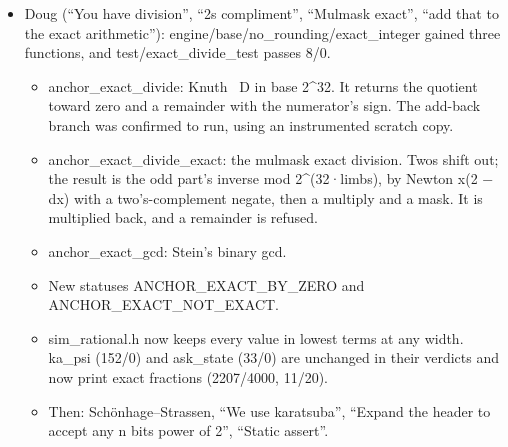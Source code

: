 \begin{enumerate}
\begin{itemize}
\begin{itemize}
\item LEMMA 3.4 IS FALSE AT k = 1. ξ(0.1, 0) − ξ(0, 0.9) = 1/10 − (9/10)α₂ = 0.0090999… < γ\textasciicircum{}−2, and the n = 3 analogue gives 9.0998 units. Lemma 3.8's supports (ramp γ\textasciicircum{}−β(k+1)) overlap at k = 1.
\item The proof's break: (3.11), the α cut at r ≤ k, does hold. It measures exactly 10, 50 and 500050 units for n = 2 at k = 1, 2, 3, and 10 and 5000 units for n = 3 at k = 1, 2. But “the tails cannot annihilate it” does not mean “the tails keep it at or above the bound”.
\item Correct: |µ\_\allowbreak{}k| ≥ γ\textasciicircum{}−nβ(k) − Σ\_\allowbreak{}\{p≥2\}ε\_\allowbreak{}\{k,p\}, about (γ−1)u' with u' = γ\textasciicircum{}−β(k+1). That beats the image width (γ−2)b\_\allowbreak{}k ≈ 8.81u' (n = 2) and 8.88u' (n = 3). With ramp ρ = γ\textasciicircum{}−(β(k+1)+2), the supports are disjoint at every k: checked symbolically for k = 1..57 (n = 2) and k = 1..35 (n = 3). The paper's ramp is covered at no k by this bound.
\item Measured from k = 2 the true gaps are far wider (49.5, 500049.5 and 5000 units). The shifts check: m + 1 = 2n + 1 shifts never share a gap; with m + 1 = γ they do.
\end{itemize}
\item Doug (“You have division”, “2s compliment”, “Mulmask exact”, “add that to the exact arithmetic”): engine/base/no\_\allowbreak{}rounding/exact\_\allowbreak{}integer gained three functions, and test/exact\_\allowbreak{}divide\_\allowbreak{}test passes 8/0.

\begin{itemize}
\item anchor\_\allowbreak{}exact\_\allowbreak{}divide: Knuth~\cite{src:Knuth} D in base 2\textasciicircum{}32. It returns the quotient toward zero and a remainder with the numerator's sign. The add-back branch was confirmed to run, using an instrumented scratch copy.
\item anchor\_\allowbreak{}exact\_\allowbreak{}divide\_\allowbreak{}exact: the mulmask exact division. Twos shift out; the result is the odd part's inverse mod 2\textasciicircum{}(32·limbs), by Newton x(2 − dx) with a two's-complement negate, then a multiply and a mask. It is multiplied back, and a remainder is refused.
\item anchor\_\allowbreak{}exact\_\allowbreak{}gcd: Stein's binary gcd.
\item New statuses ANCHOR\_\allowbreak{}EXACT\_\allowbreak{}BY\_\allowbreak{}ZERO and ANCHOR\_\allowbreak{}EXACT\_\allowbreak{}NOT\_\allowbreak{}EXACT.
\item sim\_\allowbreak{}rational.h now keeps every value in lowest terms at any width. ka\_\allowbreak{}psi (152/0) and ask\_\allowbreak{}state (33/0) are unchanged in their verdicts and now print exact fractions (2207/4000, 11/20).
\item Then: Schönhage–Strassen, “We use karatsuba”, “Expand the header to accept any n bits power of 2”, “Static assert”.


\end{itemize}
\end{itemize}
\end{enumerate}
